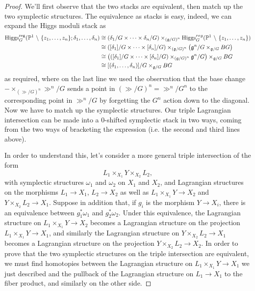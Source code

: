 \documentclass[10pt, oneside, a4paper]{article}
\begin{document}
\begin{proof}
We'll first observe that the two stacks are equivalent, then match up the two symplectic structures.  The equivalence as stacks is easy, indeed, we can expand the Higgs moduli stack as
\begin{align*}
\operatorname{Higgs}_G^{\mathrm{reg}}(\mathbb{P}^1 \ \backslash \  \{z_1, \ldots, z_n\}; \delta_1, \ldots, \delta_n) &\cong \left(\delta_1/G \times \cdots \times \delta_n/G\right) \times_{\left(\mathfrak{g}/G\right)^n} \operatorname{Higgs}_G^{reg}(\mathbb{P}^1 \ \backslash \  \{z_1, \ldots, z_n\}) \\
&\cong \left([\delta_1]/G \times \cdots \times [\delta_n]/G\right) \times_{\left(\mathfrak{g}/G\right)^n} \left(\mathfrak{g}^n/G \times_{\mathfrak{g}/G} BG\right) \\
&\cong  \left(\left([\delta_1]/G \times \cdots \times [\delta_n]/G\right) \times_{\left(\mathfrak{g}/G\right)^n} \mathfrak{g}^n/G\right) \times_{\mathfrak{g}/G} BG \\
&\cong [(\delta_1, \ldots, \delta_n)]/G \times_{\mathfrak{g}/G} BG
\end{align*}
as required, where on the last line we used the observation that the base change $- \times_{\left(\gg/G\right)^n} \gg^n/G$ sends a point in $(\gg/G)^n = \gg^n/G^n$ to the corresponding point in $\gg^n/G$ by forgetting the $G^n$ action down to the diagonal.  Now we have to match up the symplectic structures.  Our triple Lagrangian intersection can be made into a 0-shifted symplectic stack in two ways, coming from the two ways of bracketing the expression (i.e. the second and third lines above).

In order to understand this, let's consider a more general triple intersection of the form
\[L_1 \times_{X_1} Y \times_{X_2} L_2,\]
with symplectic structures $\omega_1$ and $\omega_2$ on $X_1$ and $X_2$, and Lagrangian structures on the morphisms $L_1 \to X_1$, $L_2 \to X_2$ as well as $L_1 \times_{X_1} Y \to X_2$ and $Y \times_{X_2} L_2 \to X_1$.  Suppose in addition that, if $g_i$ is the morphism $Y \to X_i$, there is an equivalence between $g_1^*\omega_1$ and $g_2^*\omega_2$.  Under this equivalence, the Lagrangian structure on $L_1 \times_{X_1} Y \to X_2$ becomes a Lagrangian structure on the projection $L_1 \times_{X_1} Y \to X_1$, and similarly the Lagrangian structure on $Y \times_{X_2} L_2 \to X_1$ becomes a Lagrangian structure on the projection $Y \times_{X_2} L_2 \to X_2$.  In order to prove that the two symplectic structures on the triple intersection are equivalent, we must find homotopies between the Lagrangian structure on $L_1 \times_{X_1} Y \to X_1$ we just described and the pullback of the Lagrangian structure on $L_1 \to X_1$ to the fiber product, and similarly on the other side.


\end{proof}
\end{document}
